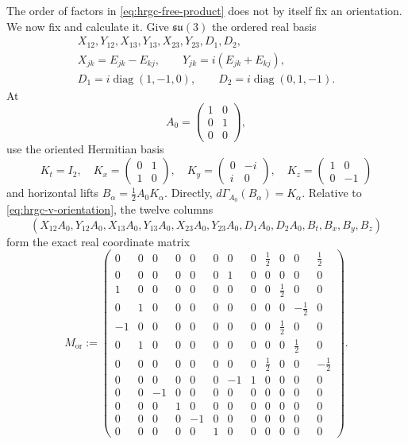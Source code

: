The order of factors in \eqref{eq:hrgc-free-product} does not by itself fix
an orientation.  We now fix and calculate it.  Give
\(\mathfrak{su}(3)\) the ordered real basis
\begin{equation}
 \begin{gathered}
 X_{12},Y_{12},X_{13},Y_{13},X_{23},Y_{23},D_1,D_2,\\
 X_{jk}=E_{jk}-E_{kj},\qquad
 Y_{jk}=i(E_{jk}+E_{kj}),\\
 D_1=i\operatorname{diag}(1,-1,0),\qquad
 D_2=i\operatorname{diag}(0,1,-1).
 \end{gathered}
 \label{eq:hrgc-su3-oriented-basis}
\end{equation}
At
\[
 A_0=\begin{pmatrix}1&0\\0&1\\0&0\end{pmatrix},
\]
use the oriented Hermitian basis
\begin{equation}
 K_t=I_2,\quad
 K_x=\begin{pmatrix}0&1\\1&0\end{pmatrix},\quad
 K_y=\begin{pmatrix}0&-i\\i&0\end{pmatrix},\quad
 K_z=\begin{pmatrix}1&0\\0&-1\end{pmatrix}
 \label{eq:hrgc-hermitian-oriented-basis}
\end{equation}
and horizontal lifts \(B_\alpha=\tfrac12A_0K_\alpha\).  Directly,
\(d\Gamma_{A_0}(B_\alpha)=K_\alpha\).  Relative to
\eqref{eq:hrgc-v-orientation}, the twelve columns
\[
 (X_{12}A_0,Y_{12}A_0,X_{13}A_0,Y_{13}A_0,
 X_{23}A_0,Y_{23}A_0,D_1A_0,D_2A_0,B_t,B_x,B_y,B_z)
\]
form the exact real coordinate matrix
\begingroup
\scriptsize
\setlength{\arraycolsep}{2.4pt}
\begin{equation}
 M_{\mathrm{or}}:=\left(
 \begin{array}{rrrrrrrrrrrr}
0&0&0&0&0&0&0&0&\frac12&0&0&\frac12\\
0&0&0&0&0&0&1&0&0&0&0&0\\
1&0&0&0&0&0&0&0&0&\frac12&0&0\\
0&1&0&0&0&0&0&0&0&0&-\frac12&0\\
-1&0&0&0&0&0&0&0&0&\frac12&0&0\\
0&1&0&0&0&0&0&0&0&0&\frac12&0\\
0&0&0&0&0&0&0&0&\frac12&0&0&-\frac12\\
0&0&0&0&0&0&-1&1&0&0&0&0\\
0&0&-1&0&0&0&0&0&0&0&0&0\\
0&0&0&1&0&0&0&0&0&0&0&0\\
0&0&0&0&-1&0&0&0&0&0&0&0\\
0&0&0&0&0&1&0&0&0&0&0&0
 \end{array}
 \right).
 \label{eq:hrgc-orientation-matrix}
\end{equation}
